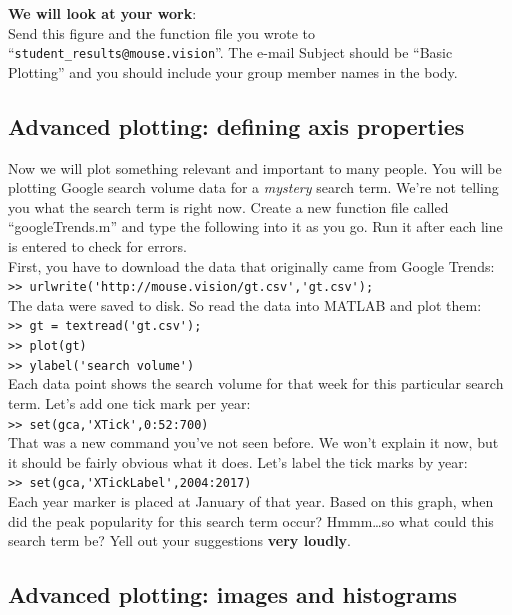\documentclass{article}
\begin{document}
\textbf{We will look at your work}: \\
Send this figure and the function file you wrote to ``\verb|student_results@mouse.vision|''.
The e-mail Subject should be ``Basic Plotting'' and you should include your group member names in the body.

\pagebreak
\subsection{Advanced plotting: defining axis properties}

Now we will plot something relevant and important to many people.
You will be plotting Google search volume data for a \emph{mystery} search term.
We're not telling you what the search term is right now.
Create a new function file called ``googleTrends.m'' and type the following into it as you go.
Run it after each line is entered to check for errors.\\

First, you have to download the data that originally came from Google Trends:\\
\verb|>> urlwrite('http://mouse.vision/gt.csv','gt.csv');|\\

The data were saved to disk. So read the data into MATLAB and plot them:\\
\verb|>> gt = textread('gt.csv');|\\
\verb|>> plot(gt)|\\
\verb|>> ylabel('search volume')|\\

Each data point shows the search volume for that week for this particular search term.
Let's add one tick mark per year:\\
\verb|>> set(gca,'XTick',0:52:700)|\\

That was a new command you've not seen before.
We won't explain it now, but it should be fairly obvious what it does.
Let's label the tick marks by year:\\
\verb|>> set(gca,'XTickLabel',2004:2017)|\\

Each year marker is placed at January of that year.
Based on this graph, when did the peak popularity for this search term occur?
Hmmm\ldots so what could this search term be?
Yell out your suggestions \textbf{very loudly}.


\pagebreak
\subsection{Advanced plotting: images and histograms}
\end{document}
